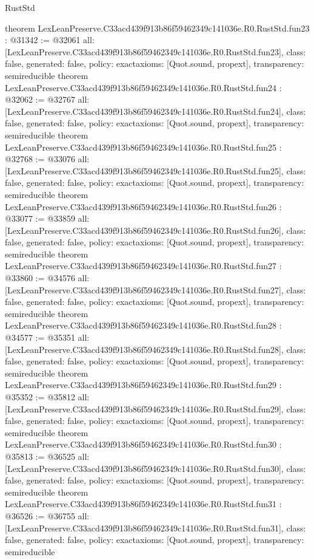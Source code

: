 \begin{lexlean}{RustStd}
\begin{coremodule}
{}
theorem LexLeanPreserve.C33acd439f913b86f59462349c141036e.R0.RustStd.fun23 : @31342 := @32061 {
  all: [LexLeanPreserve.C33acd439f913b86f59462349c141036e.R0.RustStd.fun23],
  class: false,
  generated: false,
  policy: exact{axioms: [Quot.sound, propext]},
  transparency: semireducible
}
theorem LexLeanPreserve.C33acd439f913b86f59462349c141036e.R0.RustStd.fun24 : @32062 := @32767 {
  all: [LexLeanPreserve.C33acd439f913b86f59462349c141036e.R0.RustStd.fun24],
  class: false,
  generated: false,
  policy: exact{axioms: [Quot.sound, propext]},
  transparency: semireducible
}
theorem LexLeanPreserve.C33acd439f913b86f59462349c141036e.R0.RustStd.fun25 : @32768 := @33076 {
  all: [LexLeanPreserve.C33acd439f913b86f59462349c141036e.R0.RustStd.fun25],
  class: false,
  generated: false,
  policy: exact{axioms: [Quot.sound, propext]},
  transparency: semireducible
}
theorem LexLeanPreserve.C33acd439f913b86f59462349c141036e.R0.RustStd.fun26 : @33077 := @33859 {
  all: [LexLeanPreserve.C33acd439f913b86f59462349c141036e.R0.RustStd.fun26],
  class: false,
  generated: false,
  policy: exact{axioms: [Quot.sound, propext]},
  transparency: semireducible
}
theorem LexLeanPreserve.C33acd439f913b86f59462349c141036e.R0.RustStd.fun27 : @33860 := @34576 {
  all: [LexLeanPreserve.C33acd439f913b86f59462349c141036e.R0.RustStd.fun27],
  class: false,
  generated: false,
  policy: exact{axioms: [Quot.sound, propext]},
  transparency: semireducible
}
theorem LexLeanPreserve.C33acd439f913b86f59462349c141036e.R0.RustStd.fun28 : @34577 := @35351 {
  all: [LexLeanPreserve.C33acd439f913b86f59462349c141036e.R0.RustStd.fun28],
  class: false,
  generated: false,
  policy: exact{axioms: [Quot.sound, propext]},
  transparency: semireducible
}
theorem LexLeanPreserve.C33acd439f913b86f59462349c141036e.R0.RustStd.fun29 : @35352 := @35812 {
  all: [LexLeanPreserve.C33acd439f913b86f59462349c141036e.R0.RustStd.fun29],
  class: false,
  generated: false,
  policy: exact{axioms: [Quot.sound, propext]},
  transparency: semireducible
}
theorem LexLeanPreserve.C33acd439f913b86f59462349c141036e.R0.RustStd.fun30 : @35813 := @36525 {
  all: [LexLeanPreserve.C33acd439f913b86f59462349c141036e.R0.RustStd.fun30],
  class: false,
  generated: false,
  policy: exact{axioms: [Quot.sound, propext]},
  transparency: semireducible
}
theorem LexLeanPreserve.C33acd439f913b86f59462349c141036e.R0.RustStd.fun31 : @36526 := @36755 {
  all: [LexLeanPreserve.C33acd439f913b86f59462349c141036e.R0.RustStd.fun31],
  class: false,
  generated: false,
  policy: exact{axioms: [Quot.sound, propext]},
  transparency: semireducible
}
\end{coremodule}
\end{lexlean}
